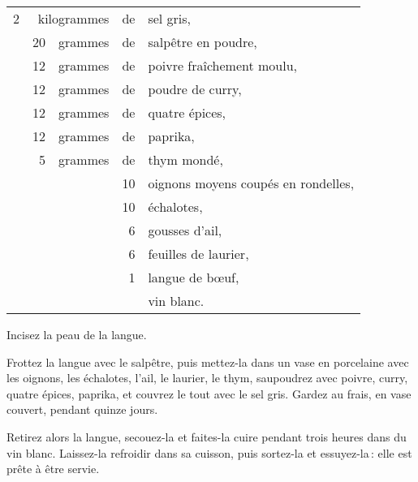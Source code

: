 \footnotesize
\begin{longtable}{rrrrp{18em}}
  2 &  \multicolumn{2}{r}{kilogrammes} & de & sel gris,                                                   \\
    & 20 & grammes & de & salpêtre en poudre,                                                             \\
    & 12 & grammes & de & poivre fraîchement moulu,                                                       \\
    & 12 & grammes & de & poudre de curry,                                                                \\
    & 12 & grammes & de & quatre épices,                                                                  \\
    & 12 & grammes & de & paprika,                                                                        \\
    &  5 & grammes & de & thym mondé,                                                                     \\
    &    &         & 10 & oignons moyens coupés en rondelles,                                             \\
    &    &         & 10 & échalotes,                                                                      \\
    &    &         &  6 & gousses d'ail,                                                                  \\
    &    &         &  6 & feuilles de laurier,                                                            \\
    &    &         &  1 & langue de bœuf,                                                                 \\
    &    &         &    & vin blanc.                                                                      \\
\end{longtable}
\normalsize

Incisez la peau de la langue.

Frottez la langue avec le salpêtre, puis mettez-la dans un vase en porcelaine
avec les oignons, les échalotes, l'ail, le laurier, le thym, saupoudrez avec
poivre, curry, quatre épices, paprika, et couvrez le tout avec le sel gris.
Gardez au frais, en vase couvert, pendant quinze jours.

Retirez alors la langue, secouez-la et faites-la cuire pendant trois heures
dans du vin blanc. Laissez-la refroidir dans sa cuisson, puis sortez-la et
essuyez-la : elle est prête à être servie.

